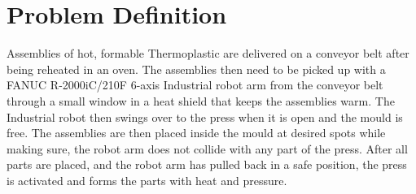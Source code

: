\chapter{Problem Definition}

Assemblies of hot, formable Thermoplastic are delivered on a conveyor belt after being reheated in an oven. The assemblies then need to be picked up with a FANUC R-2000iC/210F 6-axis Industrial robot arm from the conveyor belt through a small window in a heat shield that keeps the assemblies warm. The Industrial robot then swings over to the press when it is open and the mould is free. The assemblies are then placed inside the mould at desired spots while making sure, the robot arm does not collide with any part of the press. After all parts are placed, and the robot arm has pulled back in a safe position, the press is activated and forms the parts with heat and pressure.
